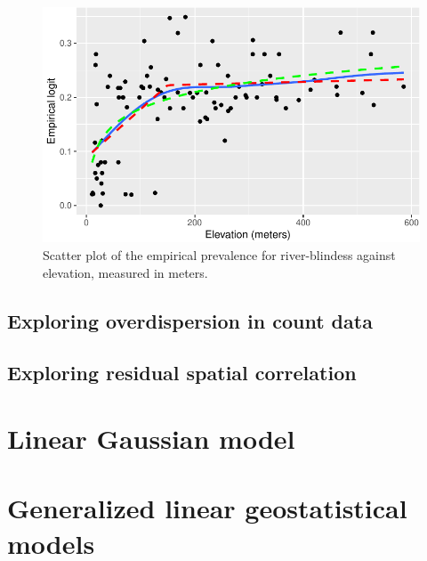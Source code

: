 \documentclass[
  letterpaper,
]{krantz}
\begin{document}
\begin{figure}[H]

{\centering \includegraphics{03_model-fitting_files/figure-pdf/fig-elogit-elev-liberia-1.pdf}

}

\caption{\label{fig-elogit-elev-liberia}Scatter plot of the empirical
prevalence for river-blindess against elevation, measured in meters.}

\end{figure}

\hypertarget{exploring-overdispersion-in-count-data}{%
\section{Exploring overdispersion in count
data}\label{exploring-overdispersion-in-count-data}}

\hypertarget{exploring-residual-spatial-correlation}{%
\section{Exploring residual spatial
correlation}\label{exploring-residual-spatial-correlation}}


\hypertarget{linear-gaussian-model}{%
\chapter{Linear Gaussian model}\label{linear-gaussian-model}}


\hypertarget{generalized-linear-geostatistical-models}{%
\chapter{Generalized linear geostatistical
models}\label{generalized-linear-geostatistical-models}}
\end{document}
